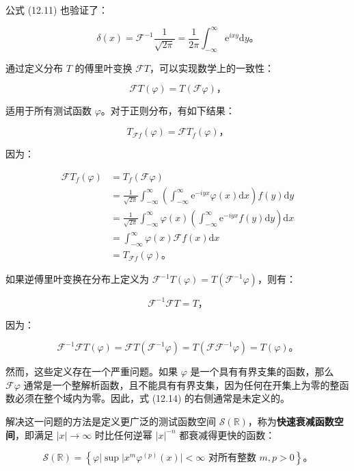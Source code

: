 公式 (12.11) 也验证了：

\[
\delta(x) = \mathcal{F}^{-1} \frac{1}{\sqrt{2 \pi}} = \frac{1}{2 \pi} \int_{-\infty}^\infty \mathrm{e}^{i x y} \mathrm{d}y。
\]

通过定义分布 \(T\) 的傅里叶变换
\(\mathcal{F} T\)，可以实现数学上的一致性：

\[
\mathcal{F} T(\varphi)=T(\mathcal{F} \varphi)，
\]

适用于所有测试函数 \(\varphi\)。对于正则分布，有如下结果：

\[
T_{\mathcal{F} f}(\varphi) = \mathcal{F} T_f(\varphi)，
\]

因为：

\[
\begin{aligned}
\mathcal{F} T_f(\varphi) & = T_f(\mathcal{F} \varphi) \\
& = \frac{1}{\sqrt{2 \pi}} \int_{-\infty}^\infty \left(\int_{-\infty}^\infty \mathrm{e}^{-i y x} \varphi(x) \mathrm{d}x \right) f(y) \mathrm{d}y \\
& = \frac{1}{\sqrt{2 \pi}} \int_{-\infty}^\infty \varphi(x) \left(\int_{-\infty}^\infty \mathrm{e}^{-i y x} f(y) \mathrm{d}y \right) \mathrm{d}x \\
& = \int_{-\infty}^\infty \varphi(x) \mathcal{F} f(x) \mathrm{d}x \\
& = T_{\mathcal{F} f}(\varphi)。
\end{aligned}
\]

如果逆傅里叶变换在分布上定义为
\(\mathcal{F}^{-1} T(\varphi)=T\left(\mathcal{F}^{-1} \varphi\right)\)，则有：

\[
\mathcal{F}^{-1} \mathcal{F} T = T，
\]

因为：

\[
\mathcal{F}^{-1} \mathcal{F} T(\varphi) = \mathcal{F} T\left(\mathcal{F}^{-1} \varphi\right) = T\left(\mathcal{F F}^{-1} \varphi\right) = T(\varphi)。
\]

然而，这些定义存在一个严重问题。如果 \(\varphi\)
是一个具有有界支集的函数，那么 \(\mathcal{F} \varphi\)
通常是一个整解析函数，且不能具有有界支集，因为任何在开集上为零的整函数必须在整个域内为零。因此，式
(12.14) 的右侧通常是未定义的。

解决这一问题的方法是定义更广泛的测试函数空间
\(\mathcal{S}(\mathbb{R})\)，称为\textbf{快速衰减函数空间}，即满足
\(|x| \to \infty\) 时比任何逆幂 \(|x|^{-n}\) 都衰减得更快的函数：

\[
\mathcal{S}(\mathbb{R}) = \left\{\varphi | \sup |x^m \varphi^{(p)}(x)| < \infty \text{ 对所有整数 } m, p > 0 \right\}。
\]

